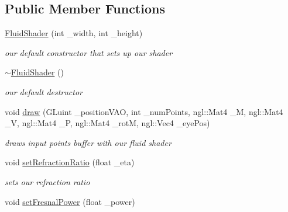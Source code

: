 \subsection*{Public Member Functions}
\begin{DoxyCompactItemize}
\item 
\hyperlink{class_fluid_shader_ad3f76a7573c376b87189c0074d323e19}{Fluid\-Shader} (int \-\_\-width, int \-\_\-height)
\begin{DoxyCompactList}\small\item\em our default constructor that sets up our shader \end{DoxyCompactList}\item 
\hypertarget{class_fluid_shader_a00151325231de231c26c85bde9a7587d}{\hyperlink{class_fluid_shader_a00151325231de231c26c85bde9a7587d}{$\sim$\-Fluid\-Shader} ()}\label{class_fluid_shader_a00151325231de231c26c85bde9a7587d}

\begin{DoxyCompactList}\small\item\em our default destructor \end{DoxyCompactList}\item 
void \hyperlink{class_fluid_shader_ae4a324bbc4f7926bab3d45fb58ba59f6}{draw} (G\-Luint \-\_\-position\-V\-A\-O, int \-\_\-num\-Points, ngl\-::\-Mat4 \-\_\-\-M, ngl\-::\-Mat4 \-\_\-\-V, ngl\-::\-Mat4 \-\_\-\-P, ngl\-::\-Mat4 \-\_\-rot\-M, ngl\-::\-Vec4 \-\_\-eye\-Pos)
\begin{DoxyCompactList}\small\item\em draws input points buffer with our fluid shader \end{DoxyCompactList}\item 
\hypertarget{class_fluid_shader_ae91addca716706b77c3d78df77bf9860}{void \hyperlink{class_fluid_shader_ae91addca716706b77c3d78df77bf9860}{set\-Refraction\-Ratio} (float \-\_\-eta)}\label{class_fluid_shader_ae91addca716706b77c3d78df77bf9860}

\begin{DoxyCompactList}\small\item\em sets our refraction ratio \end{DoxyCompactList}\item 
\hypertarget{class_fluid_shader_ae02755692742b4c8e5fb5ed139709a42}{void \hyperlink{class_fluid_shader_ae02755692742b4c8e5fb5ed139709a42}{set\-Fresnal\-Power} (float \-\_\-power)}\label{class_fluid_shader_ae02755692742b4c8e5fb5ed139709a42}


\end{DoxyCompactItemize}
